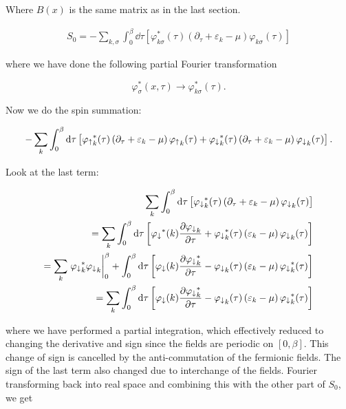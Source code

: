 Where $B(x)$ is the same matrix as in the last section. 

\begin{align*}
    S_0 = -\sum_{k, \sigma} \int_{0}^{\beta} \dd \tau \left[ \varphi_{k\sigma} ^* (\tau) \left( \partial_\tau + \varepsilon_k - \mu \right) \varphi_{k \sigma} (\tau) \right] 
\end{align*}

where we have done the following partial Fourier transformation 

\begin{equation*}
    \varphi_\sigma^*(x,\tau) \to \varphi^*_{k \sigma}(\tau).
\end{equation*}

Now we do the spin summation: 

\begin{align*}
    -\sum_k \int_{0}^{\beta} \dd \tau \left[ {\varphi_\uparrow}_{k}^* (\tau) \left( \partial_\tau + \varepsilon_k - \mu \right) {\varphi_\uparrow}_{k} (\tau) + {\varphi_\downarrow}_{k}^* (\tau) \left( \partial_\tau + \varepsilon_k - \mu \right) {\varphi_\downarrow}_{k} (\tau)\right].
\end{align*}

Look at the last term: 

\begin{align*}
    \sum_k \int_{0}^{\beta} \dd \tau \left[{\pd}_{k} ^* (\tau) \left( \partial_\tau + \varepsilon_k - \mu \right) {\pd}_{k} (\tau)\right] \\ 
    = \sum_k \int_{0}^{\beta} \dd \tau \left[{\pd}^*(k) \pdv{{\pd}_k}{\tau} + {\pd}_{k} ^* (\tau) \left(\varepsilon_k - \mu \right) {\pd}_{k} (\tau)\right] \\ 
    = \sum_k \eval{{\pd}_k^* {\pd}_k}_0 ^\beta + \int_{0}^{\beta} \dd \tau \left[{\pd}(k) \pdv{{\pd}^*_k}{\tau} - {\pd}_{k} (\tau) \left(\varepsilon_k - \mu \right) {\pd}_{k}^* (\tau)\right] \\ 
    = \sum_k \int_{0}^{\beta} \dd \tau \left[{\pd}(k) \pdv{{\pd}^*_k}{\tau} - {\pd}_{k} (\tau) \left(\varepsilon_k - \mu \right) {\pd}_{k}^* (\tau)\right]
\end{align*}

where we have performed a partial integration, which effectively reduced to changing the derivative and sign since the fields are periodic on $[0, \beta]$. This change of sign is cancelled by the anti-commutation of the fermionic fields. The sign of the last term also changed due to interchange of the fields. Fourier transforming back into real space and combining this with the other part of $S_0$, we get 

